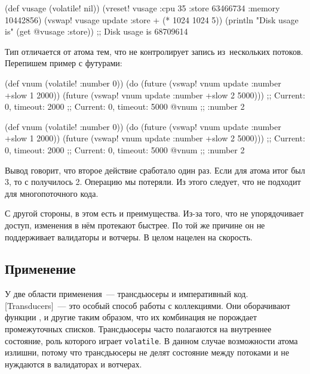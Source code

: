 \else

\begin{clojure}
(def vusage (volatile! nil))
(vreset! vusage
         {:cpu 35
          :store 63466734
          :memory 10442856})
(vswap! vusage update :store + (* 1024 1024 5))
(println "Disk usage is" (get @vusage :store))
;; Disk usage is 68709614
\end{clojure}

\fi

Тип  отличается от атома тем, что не контролирует запись
из~нескольких потоков. Перепишем пример с футурами:

\ifnarrow

\begin{clojure}
(def vnum (volatile! {:number 0}))
(do (future (vswap! vnum update
              :number +slow 1 2000))
    (future (vswap! vnum update
              :number +slow 2 5000)))
;; Current: 0, timeout: 2000
;; Current: 0, timeout: 5000
@vnum ;; {:number 2}
\end{clojure}

\else

\begin{clojure}
(def vnum (volatile! {:number 0}))
(do (future (vswap! vnum update :number +slow 1 2000))
    (future (vswap! vnum update :number +slow 2 5000)))
;; Current: 0, timeout: 2000
;; Current: 0, timeout: 5000
@vnum ;; {:number 2}
\end{clojure}

\fi


Вывод говорит, что второе действие сработало один раз. Если для атома итог был
3, то с  получилось 2. Операцию  мы потеряли. Из
этого следует, что  не подходит для многопоточного кода.

С другой стороны, в этом есть и преимущества. Из-за того, что  не
упорядочивает доступ, изменения в нём протекают быстрее. По той же причине он не
поддерживает валидаторы и вотчеры. В целом  нацелен на скорость.

\subsection{Применение}

У  две области применения~--- трансдьюсеры и императивный
код. [Trans\-ducers]~---
это особый способ работы с коллекциями. Они оборачивают функции ,
 и другие таким образом, что их комбинация не порождает
промежуточных списков. Трансдьюсеры часто полагаются на внутреннее состояние,
роль которого играет \texttt{volatile}. В данном случае возможности атома
излишни, потому что трансдьюсеры не делят состояние между потоками и не
нуждаются в валидаторах и вотчерах.

